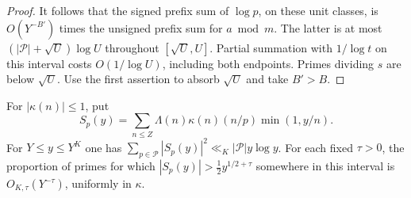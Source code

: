\begin{proof}
It follows that the signed prefix sum of \(\log p\), on these unit classes,
is \(O(Y^{-B'})\) times the unsigned prefix sum for \(a\bmod m\).
The latter is at most \((|\mathcal P|+\sqrt U)\log U\) throughout
\([\sqrt U,U]\). Partial summation with \(1/\log t\) on this interval
costs \(O(1/\log U)\), including both endpoints. Primes dividing \(s\)
are below \(\sqrt U\). Use the first assertion to absorb \(\sqrt U\)
and take \(B'>B\).
\end{proof}

\begin{proposition}\label{pr:ms}
For \(|\kappa(n)|\le1\), put
\[
 S_p(y)=\sum_{n\le Z}\Lambda(n)\kappa(n)(n/p)\min(1,y/n).
\]
For \(Y\le y\le Y^K\) one has
\(\sum_{p\in\mathcal P}|S_p(y)|^2\ll_K |\mathcal P|y\log y\).
For each fixed \(\tau>0\), the proportion of primes for which
\(|S_p(y)|>\tfrac12y^{1/2+\tau}\) somewhere in this interval is
\(O_{K,\tau}(Y^{-\tau})\), uniformly in \(\kappa\).
\end{proposition}
